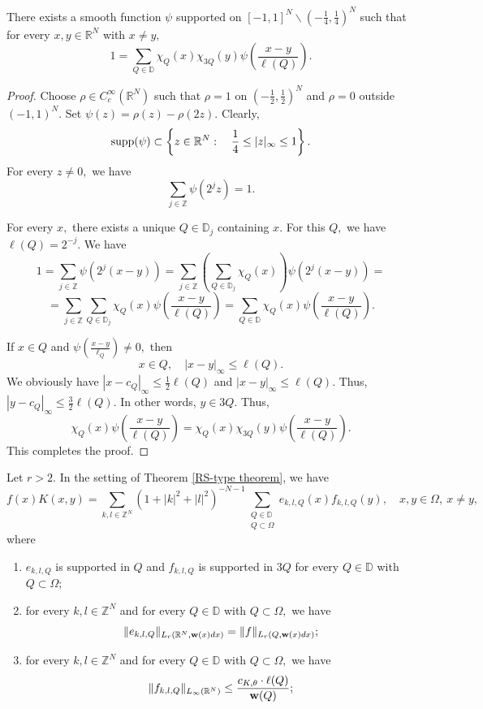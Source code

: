 \documentclass{amsart}
\begin{document}
\begin{lemma}\label{Keydecomposition}
There exists a smooth function $\psi$ supported on $[-1,1]^N\backslash(-\frac14,\frac14)^N$ such that for every $x,y\in\mathbb{R}^N$ with $x\neq y,$
$$1=\sum_{Q\in\mathbb{D}}\chi_Q(x)\chi_{3Q}(y)\psi(\frac{x-y}{\ell(Q)}).$$
\end{lemma}
\begin{proof} Choose $\rho\in C_c^{\infty}(\mathbb{R}^N)$ such that $\rho=1$ on $(-\frac12,\frac12)^N$ and $\rho=0$ outside $(-1,1)^N.$ Set $\psi(z)=\rho(z)-\rho(2z).$ Clearly,
$${\rm supp}(\psi)\subset
\left\{z\in\mathbb{R}^N:\quad
\frac14\leq |z|_{\infty}\leq 1\right\}.$$
For every $z\neq0,$ we have
\begin{equation}\label{eq:rankone-psi-partition}
\sum_{j\in\mathbb{Z}}\psi(2^jz)=1.
\end{equation}

For every $x,$ there exists a unique $Q\in\mathbb{D}_j$ containing $x.$ For this $Q,$ we have $\ell(Q)=2^{-j}.$ We have
$$1=\sum_{j\in\mathbb{Z}}\psi(2^j(x-y))=\sum_{j\in\mathbb{Z}}(\sum_{Q\in\mathbb{D}_j}\chi_Q(x))\psi(2^j(x-y))=$$
$$=\sum_{j\in\mathbb{Z}}\sum_{Q\in\mathbb{D}_j}\chi_Q(x)\psi(\frac{x-y}{\ell(Q)})=\sum_{Q\in\mathbb{D}}\chi_Q(x)\psi(\frac{x-y}{\ell(Q)}).$$

If $x\in Q$ and $\psi(\frac{x-y}{\ell_Q})\neq 0,$ then
$$x\in Q,\quad |x-y|_{\infty}\leq\ell(Q).$$
We obviously have $|x-c_Q|_{\infty}\leq\frac12\ell(Q)$ and $|x-y|_{\infty}\leq\ell(Q).$ Thus, $|y-c_Q|_{\infty}\leq\frac32\ell(Q).$ In other words, $y\in 3Q.$ Thus,
$$\chi_Q(x)\psi(\frac{x-y}{\ell(Q)})=\chi_Q(x)\chi_{3Q}(y)\psi(\frac{x-y}{\ell(Q)}).$$
This completes the proof.
\end{proof}

\begin{lemma}\label{lem:Weyl-off-diagonal-kernel-NWO}
Let $r>2.$ In the setting of Theorem \ref{RS-type theorem}, we have
$$f(x)K(x,y)=\sum_{k,l\in\mathbb{Z}^N}(1+|k|^2+|l|^2)^{-N-1}\sum_{\substack{Q\in\mathbb{D}\\ Q\subset\Omega}}e_{k,l,Q}(x)f_{k,l,Q}(y),\quad x,y\in\Omega,\ x\neq y,$$
where
\begin{enumerate}[{\rm (i)}]
\item $e_{k,l,Q}$ is supported in $Q$ and
$f_{k,l,Q}$ is supported in $3Q$ for every
$Q\in\mathbb{D}$ with $Q\subset\Omega;$
\item for every $k,l\in\mathbb{Z}^N$ and for every
$Q\in\mathbb{D}$ with $Q\subset\Omega,$ we have
$$\|e_{k,l,Q}\|_{L_r(\mathbb{R}^N,{\bf w}(x)dx)}=\|f\|_{L_r(Q,{\bf w}(x)dx)};$$
\item for every $k,l\in\mathbb{Z}^N$ and for every
$Q\in\mathbb{D}$ with $Q\subset\Omega,$ we have
$$\|f_{k,l,Q}\|_{L_{\infty}(\mathbb{R}^N)}\leq\frac{c_{K,\theta}\cdot\ell(Q)}{{\bf w}(Q)};$$
\end{enumerate}
\end{lemma}
\end{document}
